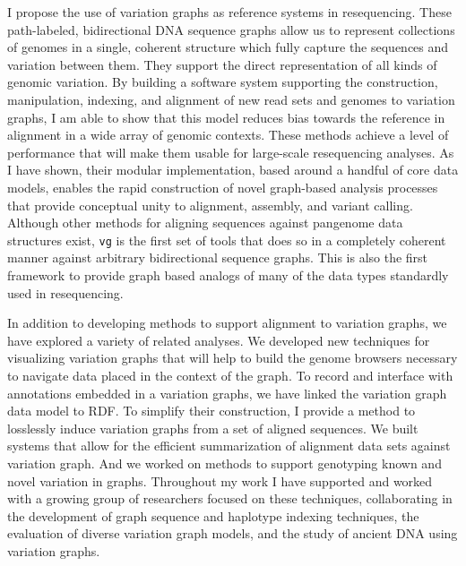 \documentclass[a4paper,12pt,numbered,oneside]{Classes/PhDThesisPSnPDF}
\begin{document}
I propose the use of variation graphs as reference systems in resequencing.
These path-labeled, bidirectional DNA sequence graphs allow us to represent collections of genomes in a single, coherent structure which fully capture the sequences and variation between them.
They support the direct representation of all kinds of genomic variation.
By building a software system supporting the construction, manipulation, indexing, and alignment of new read sets and genomes to variation graphs, I am able to show that this model reduces bias towards the reference in alignment in a wide array of genomic contexts.
These methods achieve a level of performance that will make them usable for large-scale resequencing analyses.
As I have shown, their modular implementation, based around a handful of core data models, enables the rapid construction of novel graph-based analysis processes that provide conceptual unity to alignment, assembly, and variant calling.
Although other methods for aligning sequences against pangenome data structures exist, {\tt vg} is the first set of tools that does so in a completely coherent manner against arbitrary bidirectional sequence graphs.
This is also the first framework to provide graph based analogs of many of the data types standardly used in resequencing.

In addition to developing methods to support alignment to variation graphs, we have explored a variety of related analyses.
We developed new techniques for visualizing variation graphs that will help to build the genome browsers necessary to navigate data placed in the context of the graph.
To record and interface with annotations embedded in a variation graphs, we have linked the variation graph data model to RDF.
To simplify their construction, I provide a method to losslessly induce variation graphs from a set of aligned sequences.
We built systems that allow for the efficient summarization of alignment data sets against variation graph.
And we worked on methods to support genotyping known and novel variation in graphs.
Throughout my work I have supported and worked with a growing group of researchers focused on these techniques, collaborating in the development of graph sequence and haplotype indexing techniques, the evaluation of diverse variation graph models, and the study of ancient DNA using variation graphs.
\end{document}
